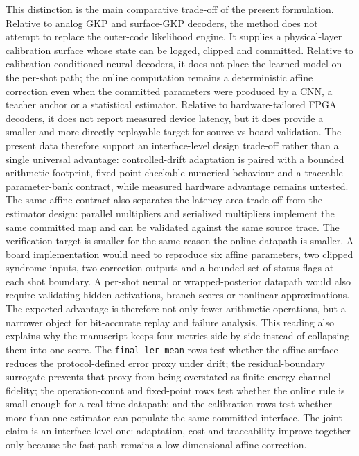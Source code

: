 \documentclass[11pt]{article}
\newcommand{\finalLER}{\texttt{final\_ler\_mean}}
\begin{document}
This distinction is the main comparative trade-off of the present formulation.
Relative to analog GKP and surface-GKP decoders, the method does not attempt to
replace the outer-code likelihood engine.  It supplies a physical-layer
calibration surface whose state can be logged, clipped and committed.  Relative
to calibration-conditioned neural decoders, it does not place the learned model
on the per-shot path; the online computation remains a deterministic affine
correction even when the committed parameters were produced by a CNN, a teacher
anchor or a statistical estimator.  Relative to hardware-tailored FPGA decoders,
it does not report measured device latency, but it does provide a smaller
and more directly replayable target for source-vs-board validation.  The
present data therefore support an interface-level design trade-off rather than a
single universal advantage: controlled-drift adaptation is paired with a
bounded arithmetic footprint, fixed-point-checkable numerical behaviour and a
traceable parameter-bank contract, while measured hardware advantage remains
untested.  The same affine contract also separates the latency-area
trade-off from the estimator design: parallel multipliers and serialized
multipliers implement the same committed map and can be validated against the
same source trace.
The verification target is smaller for the same reason the online datapath is
smaller.  A board implementation would need to reproduce six affine parameters,
two clipped syndrome inputs, two correction outputs and a bounded set of status
flags at each shot boundary.  A per-shot neural or wrapped-posterior datapath
would also require validating hidden activations, branch scores or nonlinear
approximations.  The expected advantage is therefore not only fewer arithmetic
operations, but a narrower object for bit-accurate replay and failure analysis.
This reading also explains why the manuscript keeps four metrics side by side
instead of collapsing them into one score.  The \finalLER{} rows test whether
the affine surface reduces the protocol-defined error proxy under drift; the
residual-boundary surrogate prevents that proxy from being overstated as
finite-energy channel fidelity; the operation-count and fixed-point rows test
whether the online rule is small enough for a real-time datapath; and the
calibration rows test whether more than one estimator can populate the same
committed interface.  The joint claim is an interface-level one: adaptation,
cost and traceability improve together only because the fast path remains a
low-dimensional affine correction.
\end{document}
